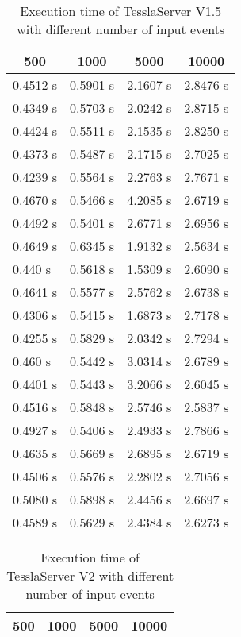 \begin{table}[!htb]
  \centering
  \caption{Execution time of TesslaServer V1.5 with different number of input events}
  \label{table:tessla_server_v1_5_events_num_events_data}
  \begin{tabular}{llll}
    \multicolumn{1}{c}{500} & \multicolumn{1}{c}{1000} & \multicolumn{1}{c}{5000} & \multicolumn{1}{c}{10000} \\ \hline
    0.4512 s & 0.5901 s & 2.1607 s & 2.8476 s \\
    0.4349 s & 0.5703 s & 2.0242 s & 2.8715 s \\
    0.4424 s & 0.5511 s & 2.1535 s & 2.8250 s \\
    0.4373 s & 0.5487 s & 2.1715 s & 2.7025 s \\
    0.4239 s & 0.5564 s & 2.2763 s & 2.7671 s \\
    0.4670 s & 0.5466 s & 4.2085 s & 2.6719 s \\
    0.4492 s & 0.5401 s & 2.6771 s & 2.6956 s \\
    0.4649 s & 0.6345 s & 1.9132 s & 2.5634 s \\
    0.440 s  & 0.5618 s & 1.5309 s & 2.6090 s \\
    0.4641 s & 0.5577 s & 2.5762 s & 2.6738 s \\
    0.4306 s & 0.5415 s & 1.6873 s & 2.7178 s \\
    0.4255 s & 0.5829 s & 2.0342 s & 2.7294 s \\
    0.460 s  & 0.5442 s & 3.0314 s & 2.6789 s \\
    0.4401 s & 0.5443 s & 3.2066 s & 2.6045 s \\
    0.4516 s & 0.5848 s & 2.5746 s & 2.5837 s \\
    0.4927 s & 0.5406 s & 2.4933 s & 2.7866 s \\
    0.4635 s & 0.5669 s & 2.6895 s & 2.6719 s \\
    0.4506 s & 0.5576 s & 2.2802 s & 2.7056 s \\
    0.5080 s & 0.5898 s & 2.4456 s & 2.6697 s \\
    0.4589 s & 0.5629 s & 2.4384 s & 2.6273 s
  \end{tabular}
\end{table}

\begin{table}[!htb]
  \centering
  \caption{Execution time of TesslaServer V2 with different number of input events}
  \label{table:tessla_server_v2_events_num_events_data}
  \begin{tabular}{llll}
    \multicolumn{1}{c}{500} & \multicolumn{1}{c}{1000} & \multicolumn{1}{c}{5000} & \multicolumn{1}{c}{10000} \\ \hline
  \end{tabular}
\end{table}

